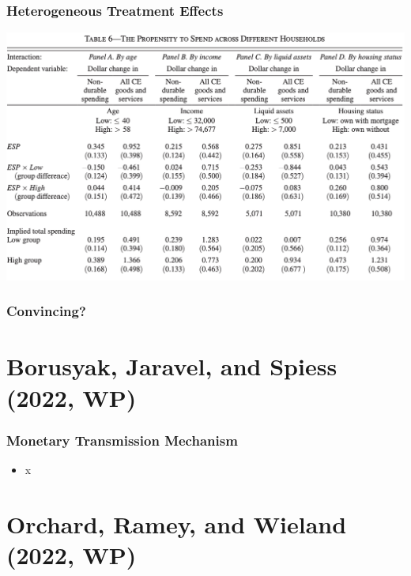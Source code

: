 \documentclass[english,xcolor=svgnames]{beamer}
\begin{document}
\begin{frame}
\frametitle[alignment=center]{Heterogeneous Treatment Effects}
\centering
\includegraphics[scale=0.6]{figures/PSMJTAB6.png}
\end{frame}


\begin{frame}
\frametitle[alignment=center]{Convincing?}

\end{frame}


\section{Borusyak, Jaravel, and Spiess (2022, WP)}

\begin{frame}
\frametitle[alignment=center]{Monetary Transmission Mechanism}
\begin{itemize}
	\item x
\end{itemize}
\end{frame}

\section{Orchard, Ramey, and Wieland (2022, WP)}
\end{document}
